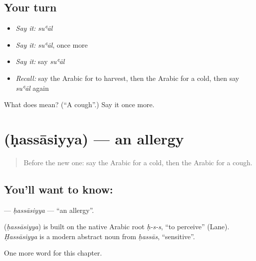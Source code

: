 \subsection*{Your turn}
\begin{itemize}
\raggedright
  \item \emph{Say it:} \emph{suʿāl}
  \item \emph{Say it:} \emph{suʿāl}, once more
  \item \emph{Say it:} say \emph{suʿāl}
  \item \emph{Recall:} say the Arabic for to harvest, then the Arabic for a cold, then say \emph{suʿāl} again
\end{itemize}

\begin{tcolorbox}[breakable,colback=teal!4,colframe=teal!35!black,title={Before you move on}]
What does  mean? (\textquotedblleft{}A cough\textquotedblright{}.) Say it once more.
\end{tcolorbox}
\section[\texorpdfstring{\ar{حساسية} (ḥassāsiyya)}{حساسية (ḥassāsiyya)}]{ (ḥassāsiyya) — an allergy}

\label{lesson:AR-C200-hassasiyya}



\begin{quote}
Before the new one: say the Arabic for a cold, then the Arabic for a cough.
\end{quote}

\subsection*{You'll want to know: }
\textbf{} — \emph{ḥassāsiyya} — \textquotedblleft{}an allergy\textquotedblright{}.

\begin{cousinweb}
\textbf{} (\emph{ḥassāsiyya}) is built on the native Arabic root \emph{ḥ-s-s}, \textquotedblleft{}to perceive\textquotedblright{} (Lane). \emph{Ḥassāsiyya} is a modern abstract noun from \emph{ḥassās}, \textquotedblleft{}sensitive\textquotedblright{}.
\end{cousinweb}

\begin{grammarlens}[title={What you've built}]
One more word for this chapter.
\end{grammarlens}

